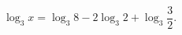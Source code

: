 \begin{ex}[type=equation]
	\begin{condition}
		$\log_3 x = \log_3 8 - 2\log_3 2+\log_3 \dfrac{3}{2}.$
	\end{condition}
\end{ex}